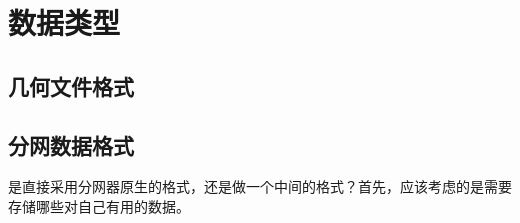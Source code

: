 \chapter{数据类型}
\section{几何文件格式}
\section{分网数据格式}
是直接采用分网器原生的格式，还是做一个中间的格式？首先，应该考虑的是需要存储哪些对自己有用的数据。

